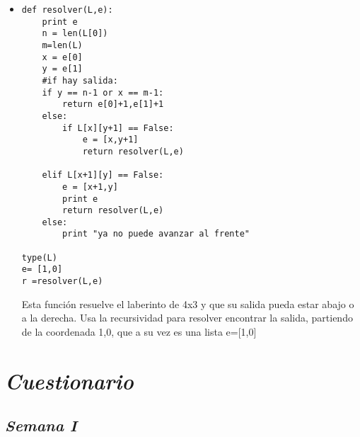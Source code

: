 \documentclass{book}
\begin{document}
\begin{enumerate}
\begin{itemize}
		
		
		\item \begin{lstlisting}
def resolver(L,e):
    print e
    n = len(L[0])
    m=len(L)
    x = e[0]
    y = e[1]
    #if hay salida:
    if y == n-1 or x == m-1:
        return e[0]+1,e[1]+1 
    else:
        if L[x][y+1] == False:
            e = [x,y+1]
            return resolver(L,e)
		
    elif L[x+1][y] == False:
        e = [x+1,y]
        print e
        return resolver(L,e)
    else:
        print "ya no puede avanzar al frente"
		
type(L)                      
e= [1,0]        
r =resolver(L,e)
		\end{lstlisting} Esta función resuelve el laberinto de 4x3 y que su salida pueda estar abajo o a la derecha. Usa la recursividad para resolver encontrar la salida, partiendo de la coordenada 1,0, que a su vez es una
		lista e=[1,0]
		
		
		
	\end{itemize}
	
	
	
	
	
	
	
\end{enumerate}


\chapter{\textit{Cuestionario}}
\section{\textit{Semana I}}%
\end{document}

